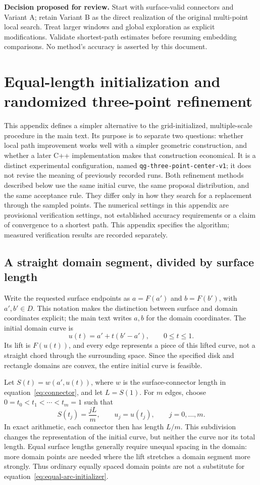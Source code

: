 \documentclass[11pt,letterpaper]{article}
\newcommand{\src}[1]{\nolinkurl{#1}}
\begin{document}
\textbf{Decision proposed for review.} Start with surface-valid connectors and Variant A; retain Variant B as the direct realization of the original multi-point local search. Treat larger windows and global exploration as explicit modifications. Validate shortest-path estimates before resuming embedding comparisons. No method's accuracy is asserted by this document.

\clearpage
\appendix
\section{Equal-length initialization and randomized three-point refinement}
\label{app:three-point}

This appendix defines a simpler alternative to the grid-initialized,
multiple-scale procedure in the main text. Its purpose is to separate two
questions: whether local path improvement works well with a simpler geometric
construction, and whether a later C++ implementation makes that construction
economical. It is a distinct experimental configuration, named
\src{qg-three-point-center-v1}; it does not revise the meaning of previously
recorded runs. Both refinement methods described below use the same initial
curve, the same proposal distribution, and the same acceptance rule. They
differ only in how they search for a replacement through the sampled points.
The numerical settings in this appendix are provisional verification settings,
not established accuracy requirements or a claim of convergence to a shortest
path. This appendix specifies the algorithm; measured verification results
are recorded separately.

\subsection{A straight domain segment, divided by surface length}

Write the requested surface endpoints as $a=F(a')$ and $b=F(b')$, with
$a',b'\in D$. This notation makes the distinction between surface and domain
coordinates explicit; the main text writes $a,b$ for the domain coordinates.
The initial domain curve is
\[
 u(t)=a'+t(b'-a'),\qquad 0\le t\le1.
\]
Its lift is $F(u(t))$, and every edge represents a piece of this lifted curve,
not a straight chord through the surrounding space. Since the specified disk
and rectangle domains are convex, the entire initial curve is feasible.

Let $S(t)=w(a',u(t))$, where $w$ is the surface-connector length in
equation~\eqref{eq:connector}, and let $L=S(1)$. For $m$ edges, choose
$0=t_0<t_1<\cdots<t_m=1$ such that
\begin{equation}\label{eq:equal-arc-initializer}
 S(t_j)=\frac{jL}{m},\qquad u_j=u(t_j),\qquad j=0,\ldots,m.
\end{equation}
In exact arithmetic, each connector then has length $L/m$. This subdivision
changes the representation of the initial curve, but neither the curve nor
its total length. Equal surface lengths generally require unequal spacing in
the domain: more domain points are needed where the lift stretches a domain
segment more strongly. Thus ordinary equally spaced domain points are not a
substitute for equation~\eqref{eq:equal-arc-initializer}.
\end{document}
